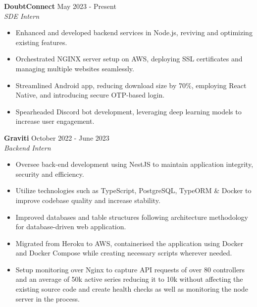 \documentclass[a4paper]{article}
\begin{document}
{\textbf{DoubtConnect }}\hfill May 2023 - Present \\
 {\textit{SDE Intern }}  \
\vspace{-2.5mm}
\begin{itemize} 
\item Enhanced and developed backend services in Node.js, reviving and optimizing existing features.
\vspace{-2mm}
\item Orchestrated NGINX server setup on AWS, deploying SSL certificates and managing multiple websites seamlessly.
\vspace{-2mm}
\item Streamlined Android app, reducing download size by 70\%, employing React Native, and introducing secure OTP-based login.
\vspace{-2mm}
\item Spearheaded Discord bot development, leveraging deep learning models to increase user engagement.
\end{itemize}

{\textbf{Graviti }}\hfill October 2022 - June 2023 \\
 {\textit{Backend Intern }}  \
\vspace{-2.5mm}
\begin{itemize} 
\item Oversee back-end development using NestJS to maintain application integrity, security and efficiency.
\vspace{-2mm}
\item Utilize technologies such as TypeScript, PostgreSQL, TypeORM \& Docker to improve 
codebase quality and increase stability.
\vspace{-2mm}
\item Improved databases and table structures following architecture methodology for database-driven web application.
\vspace{-2mm}
\item Migrated from Heroku to AWS, containerised the application using Docker and Docker Compose while creating necessary scripts wherever needed. 
\vspace{-2mm}
\item Setup monitoring over Nginx to capture API requests of over 80 controllers and an average of 50k active series reducing it to 10k without affecting the existing source code and create health checks as well as monitoring the node server in the process.
\end{itemize}
\end{document}
